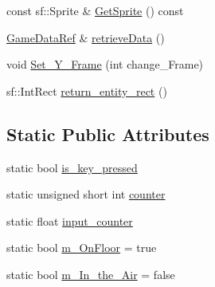 \begin{DoxyCompactItemize}
\item 
const sf\+::\+Sprite \& \hyperlink{classSekander_1_1GameWorld_ac8b727f77781b0ebeafb3b541bf17a67}{Get\+Sprite} () const
\item 
\hyperlink{namespaceSekander_a1d69b002ba2d23020901c28f0def5e16}{Game\+Data\+Ref} \& \hyperlink{classSekander_1_1GameWorld_aee698ca8d58a687e2321d7524bedabf3}{retrieve\+Data} ()
\item 
void \hyperlink{classSekander_1_1GameWorld_aaa990ab4fb0cc708a7f12ec798ba90ef}{Set\+\_\+\+Y\+\_\+\+Frame} (int change\+\_\+\+Frame)
\item 
sf\+::\+Int\+Rect \hyperlink{classSekander_1_1GameWorld_a060069f1527245efc49cc4bae9306c8d}{return\+\_\+entity\+\_\+rect} ()
\end{DoxyCompactItemize}
\subsection*{Static Public Attributes}
\begin{DoxyCompactItemize}
\item 
static bool \hyperlink{classSekander_1_1GameWorld_a59be267007f51217d7f9739029e966cd}{is\+\_\+key\+\_\+pressed}
\item 
static unsigned short int \hyperlink{classSekander_1_1GameWorld_a8b5e8a9e12e49fcd66361a83837c2b30}{counter}
\item 
static float \hyperlink{classSekander_1_1GameWorld_a0253519bdc4bb36ae9b1c835ecdcedc6}{input\+\_\+counter}
\item 
static bool \hyperlink{classSekander_1_1GameWorld_ad6495d2d0423201c931a147682104417}{m\+\_\+\+On\+Floor} = true
\item 
static bool \hyperlink{classSekander_1_1GameWorld_a2392a1e2b5d6ff4fb352144bf426ae45}{m\+\_\+\+In\+\_\+the\+\_\+\+Air} = false
\end{DoxyCompactItemize}
